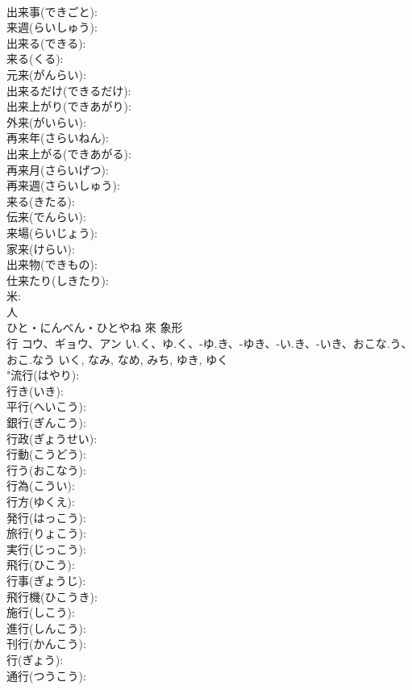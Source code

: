 \documentclass[8pt]{extreport}
\begin{document}
\begin{CJK}{UTF8}{min}
\\	出来事(できごと): 
\\	来週(らいしゅう): 
\\	出来る(できる): 
\\	来る(くる): 
\\	元来(がんらい): 
\\	出来るだけ(できるだけ): 
\\	出来上がり(できあがり): 
\\	外来(がいらい): 
\\	再来年(さらいねん): 
\\	出来上がる(できあがる): 
\\	再来月(さらいげつ): 
\\	再来週(さらいしゅう): 
\\	来る(きたる): 
\\	伝来(でんらい): 
\\	来場(らいじょう): 
\\	家来(けらい): 
\\	出来物(できもの): 
\\	仕来たり(しきたり): 
\\	米: 
\\	人	
\\	ひと・にんべん・ひとやね	來	象形 
\\	行	コウ、ギョウ、アン	い.く、ゆ.く、-ゆ.き、-ゆき、-い.き、-いき、おこな.う、おこ.なう	いく, なみ, なめ, みち, ゆき, ゆく	
\\	"流行(はやり): 
\\	行き(いき): 
\\	平行(へいこう): 
\\	銀行(ぎんこう): 
\\	行政(ぎょうせい): 
\\	行動(こうどう): 
\\	行う(おこなう): 
\\	行為(こうい): 
\\	行方(ゆくえ): 
\\	発行(はっこう): 
\\	旅行(りょこう): 
\\	実行(じっこう): 
\\	飛行(ひこう): 
\\	行事(ぎょうじ): 
\\	飛行機(ひこうき): 
\\	施行(しこう): 
\\	進行(しんこう): 
\\	刊行(かんこう): 
\\	行(ぎょう): 
\\	通行(つうこう): 

\end{CJK}
\end{document}
